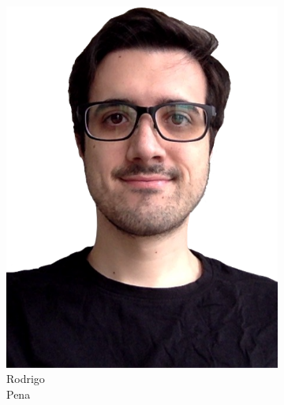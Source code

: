 \documentclass[aspectratio=169]{beamer}
\begin{document}
\begin{frame}
\begin{figure}
\begin{subfigure}[b]{0.14\linewidth}
			\includegraphics[width=\linewidth]{picture_rodrigo}
			\caption*{Rodrigo\\Pena}
		\end{subfigure}
		\hfill
		\begin{subfigure}[b]{0.14\linewidth}

\end{subfigure}
\end{figure}
\end{frame}
\end{document}
